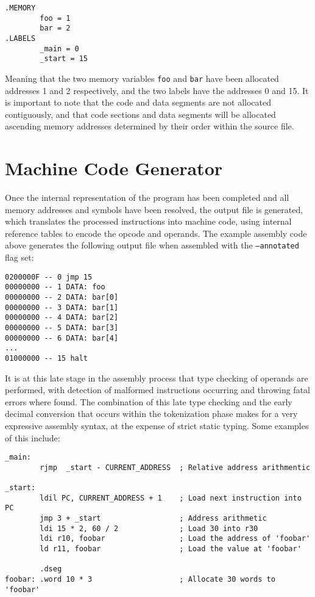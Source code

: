 \documentclass[12pt,twoside]{report}
\begin{document}
\begin{verbatim}
.MEMORY
        foo = 1
        bar = 2
.LABELS
        _main = 0
        _start = 15
\end{verbatim}

Meaning that the two memory variables \texttt{foo} and \texttt{bar}
have been allocated addresses 1 and 2 respectively, and the two labels
have the addresses 0 and 15. It is important to note that the code and
data segments are not allocated contiguously, and that code sections
and data segments will be allocated ascending memory addresses
determined by their order within the source file.

\section{Machine Code Generator}

Once the internal representation of the program has been completed and
all memory addresses and symbols have been resolved, the output file
is generated, which translates the processed instructions into machine
code, using internal reference tables to encode the opcode and
operands. The example assembly code above generates the following
output file when assembled with the \texttt{--annotated} flag set:

\begin{verbatim}
0200000F -- 0 jmp 15
00000000 -- 1 DATA: foo
00000000 -- 2 DATA: bar[0]
00000000 -- 3 DATA: bar[1]
00000000 -- 4 DATA: bar[2]
00000000 -- 5 DATA: bar[3]
00000000 -- 6 DATA: bar[4]
...
01000000 -- 15 halt
\end{verbatim}

It is at this late stage in the assembly process that type checking of
operands are performed, with detection of malformed instructions
occurring and throwing fatal errors where found. The combination of
this late type checking and the early decimal conversion that occurs
within the tokenization phase makes for a very expressive assembly
syntax, at the expense of strict static typing. Some examples of this
include:

\begin{verbatim}
_main:
        rjmp  _start - CURRENT_ADDRESS  ; Relative address arithmentic

_start:
        ldil PC, CURRENT_ADDRESS + 1    ; Load next instruction into PC
        jmp 3 + _start                  ; Address arithmetic
        ldi 15 * 2, 60 / 2              ; Load 30 into r30
        ldi r10, foobar                 ; Load the address of 'foobar'
        ld r11, foobar                  ; Load the value at 'foobar'

        .dseg
foobar: .word 10 * 3                    ; Allocate 30 words to 'foobar'
\end{verbatim}
\end{document}
